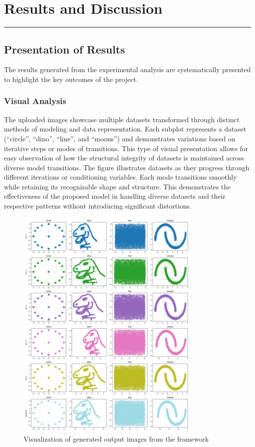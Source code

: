 \chapter{Results and Discussion}
\vspace{-1.5cm}
\hspace{-1cm}\rule{19cm}{0.4pt} 

\section{Presentation of Results}
The results generated from the experimental analysis are systematically presented to highlight the key outcomes of the project.
\subsection{Visual Analysis}
The uploaded images showcase multiple datasets transformed through distinct methods of modeling and data representation. Each subplot represents a dataset (``circle'', ``dino'', ``line'', and ``moons'') and demonstrates variations based on iterative steps or modes of transitions. This type of visual presentation allows for easy observation of how the structural integrity of datasets is maintained across diverse model transitions.
    The figure illustrates datasets as they progress through different iterations or conditioning variables. Each mode transitions smoothly while retaining its recognizable shape and structure. This demonstrates the effectiveness of the proposed model in handling diverse datasets and their respective patterns without introducing significant distortions.

\begin{figure}
    \centering
    \includegraphics[width=0.8\textwidth, height=0.7\textwidth]{images/generated_images.png}
    \caption{Visualization of generated output images from the framework}
    \label{fig:output_a} %
\end{figure}

